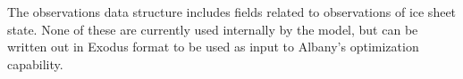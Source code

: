 The observations data structure includes fields related to observations of ice sheet state.
None of these are currently used internally by the model, but can be written out in Exodus format
to be used as input to Albany's optimization capability.
